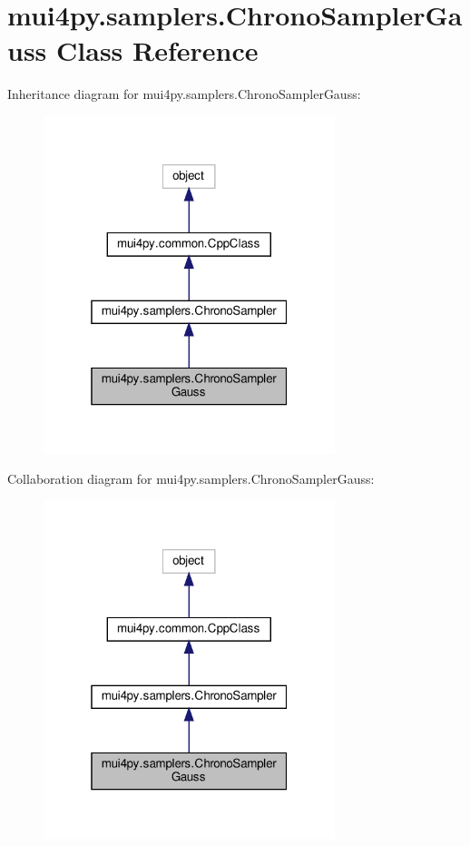 \hypertarget{classmui4py_1_1samplers_1_1_chrono_sampler_gauss}{}\section{mui4py.\+samplers.\+Chrono\+Sampler\+Gauss Class Reference}
\label{classmui4py_1_1samplers_1_1_chrono_sampler_gauss}


Inheritance diagram for mui4py.\+samplers.\+Chrono\+Sampler\+Gauss\+:
\nopagebreak
\begin{figure}[H]
\begin{center}
\leavevmode
\includegraphics[width=241pt]{classmui4py_1_1samplers_1_1_chrono_sampler_gauss__inherit__graph}
\end{center}
\end{figure}


Collaboration diagram for mui4py.\+samplers.\+Chrono\+Sampler\+Gauss\+:
\nopagebreak
\begin{figure}[H]
\begin{center}
\leavevmode
\includegraphics[width=241pt]{classmui4py_1_1samplers_1_1_chrono_sampler_gauss__coll__graph}
\end{center}
\end{figure}
